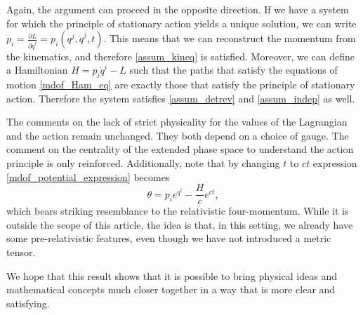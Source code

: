 \documentclass[10pt,twocolumn, nofootinbib]{revtex4-2}
\begin{document}
Again, the argument can proceed in the opposite direction. If we have a system for which the principle of stationary action yields a unique solution, we can write $p_i = \frac{\partial L}{\partial \dot{q}^i} = p_i(q^j, \dot{q}^j, t)$. This means that we can reconstruct the momentum from the kinematics, and therefore \ref{assum_kineq} is satisfied. Moreover, we can define a Hamiltonian $H = p_i \dot{q}^i - L$ such that the paths that satisfy the equations of motion \ref{mdof_Ham_eq} are exactly those that satisfy the principle of stationary action. Therefore the system satisfies \ref{assum_detrev} and \ref{assum_indep} as well.

The comments on the lack of strict physicality for the values of the Lagrangian and the action remain unchanged. They both depend on a choice of gauge. The comment on the centrality of the extended phase space to understand the action principle is only reinforced. Additionally, note that by changing $t$ to $ct$ expression \ref{mdof_potential_expression} becomes
\begin{equation}\label{mdof_potential_relativistic}
	\theta = p_i e^{q^i} - \frac{H}{c} e^{ct},
\end{equation}
which bears striking resemblance to the relativistic four-momentum. While it is outside the scope of this article, the idea is that, in this setting, we already have some pre-relativistic features, even though we have not introduced a metric tensor.

We hope that this result shows that it is possible to bring physical ideas and mathematical concepts much closer together in a way that is more clear and satisfying.
\end{document}
